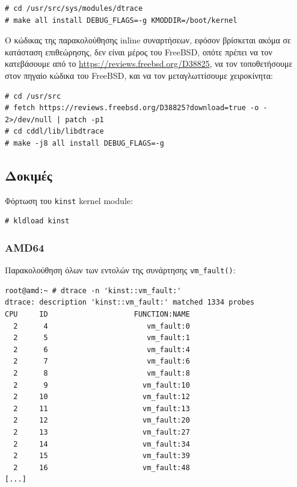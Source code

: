 \documentclass[12pt]{article}
\begin{document}
\begin{lstlisting}
# cd /usr/src/sys/modules/dtrace
# make all install DEBUG_FLAGS=-g KMODDIR=/boot/kernel
\end{lstlisting}

Ο κώδικας της παρακολούθησης inline συναρτήσεων, εφόσον βρίσκεται ακόμα σε
κατάσταση επιθεώρησης, δεν είναι μέρος του FreeBSD, οπότε πρέπει να τον
κατεβάσουμε από το
\href{https://reviews.freebsd.org/D38825}{https://reviews.freebsd.org/D38825},
να τον τοποθετήσουμε στον πηγαίο κώδικα του FreeBSD, και να τον μεταγλωττίσουμε
χειροκίνητα:

\begin{lstlisting}
# cd /usr/src
# fetch https://reviews.freebsd.org/D38825?download=true -o - 2>/dev/null | patch -p1
# cd cddl/lib/libdtrace
# make -j8 all install DEBUG_FLAGS=-g
\end{lstlisting}

\subsection{Δοκιμές}

Φόρτωση του \lstinline{kinst} kernel module:

\begin{lstlisting}
# kldload kinst
\end{lstlisting}

\subsubsection{AMD64}

Παρακολούθηση όλων των εντολών της συνάρτησης \lstinline{vm_fault()}:

\begin{lstlisting}
root@amd:~ # dtrace -n 'kinst::vm_fault:'
dtrace: description 'kinst::vm_fault:' matched 1334 probes
CPU     ID                    FUNCTION:NAME
  2      4                       vm_fault:0
  2      5                       vm_fault:1
  2      6                       vm_fault:4
  2      7                       vm_fault:6
  2      8                       vm_fault:8
  2      9                      vm_fault:10
  2     10                      vm_fault:12
  2     11                      vm_fault:13
  2     12                      vm_fault:20
  2     13                      vm_fault:27
  2     14                      vm_fault:34
  2     15                      vm_fault:39
  2     16                      vm_fault:48
[...]
\end{lstlisting}
\end{document}
